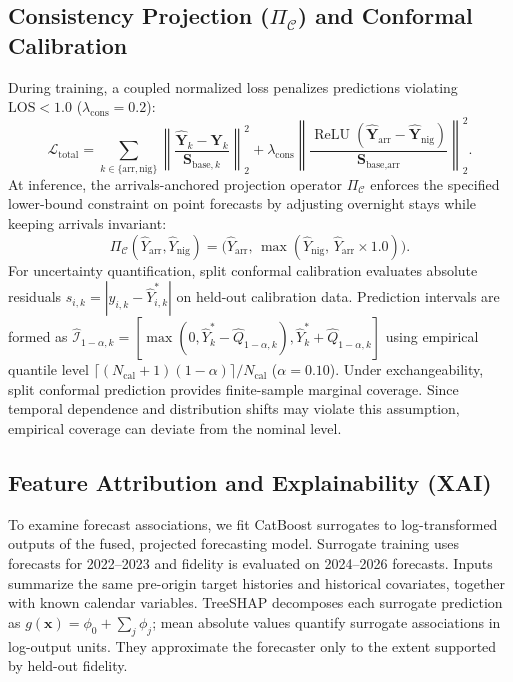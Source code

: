 \documentclass[sigconf]{acmart}
\begin{document}
\subsection{Consistency Projection \texorpdfstring{($\Pi_{\mathcal{C}}$)}{(Pi\_C)} and Conformal Calibration}
During training, a coupled normalized loss penalizes predictions violating $\text{LOS} < 1.0$ ($\lambda_{\text{cons}}=0.2$):
\begin{equation}
\mathcal{L}_{\text{total}} = \sum_{k \in \{\text{arr}, \text{nig}\}} \left\|\frac{\hat{\mathbf{Y}}_k - \mathbf{Y}_k}{\mathbf{S}_{\text{base}, k}}\right\|_2^2 + \lambda_{\text{cons}} \left\|\frac{\operatorname{ReLU}(\hat{\mathbf{Y}}_{\text{arr}} - \hat{\mathbf{Y}}_{\text{nig}})}{\mathbf{S}_{\text{base}, \text{arr}}}\right\|_2^2.
\label{eq:coupled_loss}
\end{equation}
At inference, the arrivals-anchored projection operator $\Pi_{\mathcal{C}}$ enforces the specified lower-bound constraint on point forecasts by adjusting overnight stays while keeping arrivals invariant:
\begin{equation}
\Pi_{\mathcal{C}}(\hat{Y}_{\text{arr}}, \hat{Y}_{\text{nig}}) = \big(\hat{Y}_{\text{arr}}, \, \max(\hat{Y}_{\text{nig}}, \, \hat{Y}_{\text{arr}} \times 1.0)\big).
\label{eq:projection}
\end{equation}
For uncertainty quantification, split conformal calibration \cite{vovk2005algorithmic,angelopoulos2021conformal,barber2023conformal} evaluates absolute residuals $s_{i,k}=|y_{i,k}-\hat{Y}_{i,k}^*|$ on held-out calibration data. Prediction intervals are formed as $\hat{\mathcal{I}}_{1-\alpha,k}=[\max(0,\hat{Y}_k^*-\hat{Q}_{1-\alpha,k}),\hat{Y}_k^*+\hat{Q}_{1-\alpha,k}]$ using empirical quantile level $\lceil(N_{\text{cal}}+1)(1-\alpha)\rceil/N_{\text{cal}}$ ($\alpha=0.10$). Under exchangeability, split conformal prediction provides finite-sample marginal coverage. Since temporal dependence and distribution shifts may violate this assumption, empirical coverage can deviate from the nominal level.

\subsection{Feature Attribution and Explainability (XAI)}
To examine forecast associations, we fit CatBoost surrogates to log-transformed outputs of the fused, projected forecasting model. Surrogate training uses forecasts for 2022--2023 and fidelity is evaluated on 2024--2026 forecasts. Inputs summarize the same pre-origin target histories and historical covariates, together with known calendar variables. TreeSHAP \cite{lundberg2020treeshap} decomposes each surrogate prediction as $g(\mathbf x)=\phi_0+\sum_j\phi_j$; mean absolute values quantify surrogate associations in log-output units. They approximate the forecaster only to the extent supported by held-out fidelity.
\end{document}
